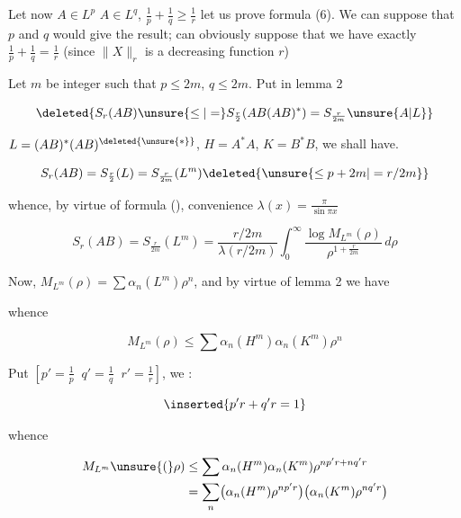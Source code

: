 Let now  $A\in L^p$ $A\in L^q$, $\frac1p+\frac1q\geq\frac1r$ let us prove formula (6). We can suppose  that $p$ and $q$    would give the result;   can obviously suppose  that we have exactly $\frac1p+\frac1q=\frac1r$ (since $\|X\|_r$ is a decreasing function  $r$)

Let $m$ be  integer such that $p\leq 2m$, $q\leq 2m$.  Put  in lemma 2


\[
\deleted{S_r(AB)\unsure{\leq|=} S_{\frac r2}(AB(AB)^*)=S_{\frac r{2m}}\unsure{A|L}}
\]

$L=(AB)^*(AB)^{\deleted{\unsure{*}}}$, $H=A^*A$, $K=B^*B$, we shall have.

\[
S_r(AB)=S_{\frac r2}(L)=S_{\frac r{2m}}(L^m)\deleted{\unsure{\leq p+2m|=r/2m}}
\]

whence, by virtue of formula (),   convenience $\lambda(x)=\frac{\pi}{\sin\pi x}$

\[
S_r(AB)=S_{\frac r{2m}}(L^m)=\frac{r/2m}{\lambda(r/2m)}
\int_0^\infty\frac{\log M_{L^m}(\rho)}{\rho^{1+\frac r{2m}}}\,d\rho \tag*{(11)}
\]

 Now, $M_{L^m}(\rho)=\sum\alpha_n(L^m)\rho^n$, and   by virtue of lemma 2 we have 


whence

\[
M_{L^m}(\rho)\leq\sum\alpha_n(H^m)\alpha_n(K^m)\rho^n
\]

Put $\left[p'=\frac1p\;\;q'=\frac1q\;\;r'=\frac1r\right]$, we : 

\[
\inserted{p'r+q'r=1}
\]

whence

\[
\begin{aligned}
M_{L^m}\unsure{(}\rho)&\leq\sum\alpha_n(H^m)\alpha_n(K^m)\rho^{np'r+nq'r}\\
&=\sum_n\bigl(\alpha_n(H^m)\rho^{np'r}\bigr)
\bigl(\alpha_n(K^m)\rho^{nq'r}\bigr)
\end{aligned}
\]
